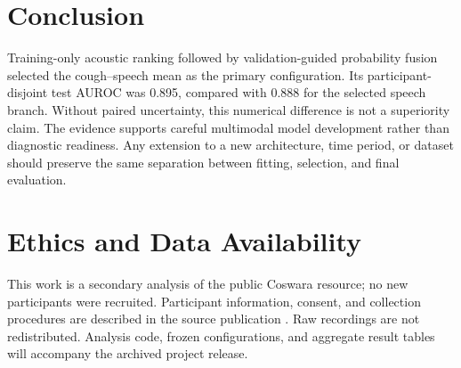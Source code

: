 \documentclass[conference]{IEEEtran}
\begin{document}
\section{Conclusion}

Training-only acoustic ranking followed by validation-guided probability
fusion selected the cough--speech mean as the primary configuration. Its
participant-disjoint test AUROC was 0.895, compared with 0.888 for the selected
speech branch. Without paired uncertainty, this numerical difference is not a
superiority claim. The evidence supports careful
multimodal model development rather than diagnostic readiness. Any extension to a
new architecture, time period, or dataset should preserve the same separation
between fitting, selection, and final evaluation.

\section*{Ethics and Data Availability}

This work is a secondary analysis of the public Coswara resource; no new
participants were recruited. Participant information, consent, and collection
procedures are described in the source publication
\cite{bhattacharya2023coswara}. Raw recordings are not redistributed. Analysis
code, frozen configurations, and aggregate result tables will accompany the
archived project release.



\end{document}

